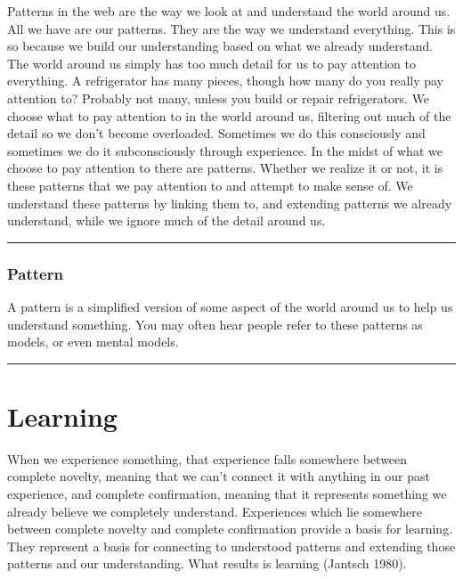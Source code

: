 \documentclass[]{memoir}
\begin{document}
Patterns in the web are the way we look at and understand the world
around us. All we have are our patterns. They are the way we understand
everything. This is so because we build our understanding based on what
we already understand. The world around us simply has too much detail
for us to pay attention to everything. A refrigerator has many pieces,
though how many do you really pay attention to? Probably not many,
unless you build or repair refrigerators. We choose what to pay
attention to in the world around us, filtering out much of the detail so
we don't become overloaded. Sometimes we do this consciously and
sometimes we do it subconsciously through experience. In the midst of
what we choose to pay attention to there are patterns. Whether we
realize it or not, it is these patterns that we pay attention to and
attempt to make sense of. We understand these patterns by linking them
to, and extending patterns we already understand, while we ignore much
of the detail around us.

\begin{center}\rule{3in}{0.4pt}\end{center}

\subsubsection{Pattern}

A pattern is a simplified version of some aspect of the world around us
to help us understand something. You may often hear people refer to
these patterns as models, or even mental models.

\begin{center}\rule{3in}{0.4pt}\end{center}

\section{Learning}

When we experience something, that experience falls somewhere between
complete novelty, meaning that we can't connect it with anything in our
past experience, and complete confirmation, meaning that it represents
something we already believe we completely understand. Experiences which
lie somewhere between complete novelty and complete confirmation provide
a basis for learning. They represent a basis for connecting to
understood patterns and extending those patterns and our understanding.
What results is learning (Jantsch 1980).
\end{document}
